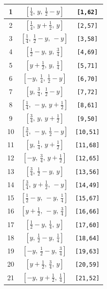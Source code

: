 \documentclass[fleqn,8pt]{jsarticle}
\begin{document}
\begin{longtable}{ccc}
1 & $\left[ \frac{1}{4},\, y,\, \frac{1}{2} - y \right]$ & {\tt [1,62]} \\ \hline
2 & $\left[ \frac{1}{4},\, y + \frac{1}{2},\, y \right]$ & {\tt [2,57]} \\ \hline
3 & $\left[ \frac{1}{4},\, \frac{1}{2} - y,\, - y \right]$ & {\tt [3,58]} \\ \hline
4 & $\left[ \frac{1}{2} - y,\, y,\, \frac{3}{4} \right]$ & {\tt [4,69]} \\ \hline
5 & $\left[ y + \frac{1}{2},\, y,\, \frac{1}{4} \right]$ & {\tt [5,71]} \\ \hline
6 & $\left[ - y,\, \frac{1}{4},\, \frac{1}{2} - y \right]$ & {\tt [6,70]} \\ \hline
7 & $\left[ y,\, \frac{3}{4},\, \frac{1}{2} - y \right]$ & {\tt [7,72]} \\ \hline
8 & $\left[ \frac{1}{4},\, - y,\, y + \frac{1}{2} \right]$ & {\tt [8,61]} \\ \hline
9 & $\left[ \frac{3}{4},\, y,\, y + \frac{1}{2} \right]$ & {\tt [9,50]} \\ \hline
10 & $\left[ \frac{3}{4},\, - y,\, \frac{1}{2} - y \right]$ & {\tt [10,51]} \\ \hline
11 & $\left[ y,\, \frac{1}{4},\, y + \frac{1}{2} \right]$ & {\tt [11,68]} \\ \hline
12 & $\left[ - y,\, \frac{3}{4},\, y + \frac{1}{2} \right]$ & {\tt [12,65]} \\ \hline
13 & $\left[ \frac{3}{4},\, \frac{1}{2} - y,\, y \right]$ & {\tt [13,56]} \\ \hline
14 & $\left[ \frac{3}{4},\, y + \frac{1}{2},\, - y \right]$ & {\tt [14,49]} \\ \hline
15 & $\left[ \frac{1}{2} - y,\, - y,\, \frac{1}{4} \right]$ & {\tt [15,67]} \\ \hline
16 & $\left[ y + \frac{1}{2},\, - y,\, \frac{3}{4} \right]$ & {\tt [16,66]} \\ \hline
17 & $\left[ \frac{1}{2} - y,\, \frac{1}{4},\, y \right]$ & {\tt [17,60]} \\ \hline
18 & $\left[ y,\, \frac{1}{2} - y,\, \frac{1}{4} \right]$ & {\tt [18,64]} \\ \hline
19 & $\left[ - y,\, \frac{1}{2} - y,\, \frac{3}{4} \right]$ & {\tt [19,63]} \\ \hline
20 & $\left[ y + \frac{1}{2},\, \frac{3}{4},\, y \right]$ & {\tt [20,59]} \\ \hline
21 & $\left[ - y,\, y + \frac{1}{2},\, \frac{1}{4} \right]$ & {\tt [21,52]} \\ \hline

\end{longtable}
\end{document}
